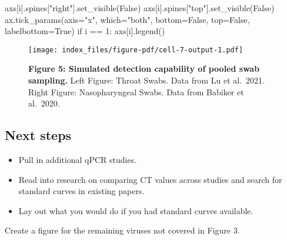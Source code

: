 \documentclass[
  letterpaper,
  DIV=11,
  numbers=noendperiod]{scrartcl}
\newenvironment{Shaded}{\begin{snugshade}}{\end{snugshade}}
\newcommand{\ControlFlowTok}[1]{\textcolor[rgb]{0.00,0.23,0.31}{#1}}
\newcommand{\DecValTok}[1]{\textcolor[rgb]{0.68,0.00,0.00}{#1}}
\newcommand{\NormalTok}[1]{\textcolor[rgb]{0.00,0.23,0.31}{#1}}
\newcommand{\OperatorTok}[1]{\textcolor[rgb]{0.37,0.37,0.37}{#1}}
\newcommand{\StringTok}[1]{\textcolor[rgb]{0.13,0.47,0.30}{#1}}
\newcommand{\VariableTok}[1]{\textcolor[rgb]{0.07,0.07,0.07}{#1}}
\providecommand{\tightlist}{%
  \setlength{\itemsep}{0pt}\setlength{\parskip}{0pt}}\usepackage{longtable,booktabs,array}
\begin{document}
\begin{Shaded}
\begin{Highlighting}[]
\NormalTok{    axs[i].spines[}\StringTok{"right"}\NormalTok{].set\_visible(}\VariableTok{False}\NormalTok{)}
\NormalTok{    axs[i].spines[}\StringTok{"top"}\NormalTok{].set\_visible(}\VariableTok{False}\NormalTok{)}
\NormalTok{    ax.tick\_params(axis}\OperatorTok{=}\StringTok{"x"}\NormalTok{, which}\OperatorTok{=}\StringTok{"both"}\NormalTok{, bottom}\OperatorTok{=}\VariableTok{False}\NormalTok{, top}\OperatorTok{=}\VariableTok{False}\NormalTok{, labelbottom}\OperatorTok{=}\VariableTok{True}\NormalTok{)}
    \ControlFlowTok{if}\NormalTok{ i }\OperatorTok{==} \DecValTok{1}\NormalTok{:}
\NormalTok{        axs[i].legend()}
\end{Highlighting}
\end{Shaded}

\begin{figure}[H]

{\centering \texttt{[image: index\_files/figure-pdf/cell-7-output-1.pdf]}

}

\caption{\textbf{Figure 5: Simulated detection capability of pooled swab
sampling.} Left Figure: Throat Swabs. Data from Lu et al.~2021. Right
Figure: Nasopharyngeal Swabs. Data from Babiker et al.~2020.}

\end{figure}%

\subsection{Next steps}\label{next-steps}

\begin{itemize}
\tightlist
\item
  Pull in additional qPCR studies.
\item
  Read into research on comparing CT values across studies and search
  for standard curves in existing papers.
\item
  Lay out what you would do if you had standard curves available.
\end{itemize}

Create a figure for the remaining viruses not covered in Figure 3.
\end{document}

